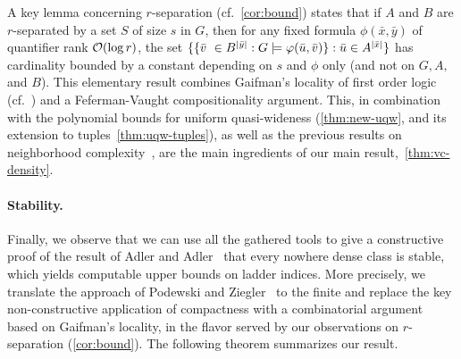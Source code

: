 A key lemma concerning $r$-separation (cf.~\cref{cor:bound}) states that if $A$
and $B$ are $r$-separated by a set $S$ of size $s$ in $G$,
then for any fixed formula $\phi(\bar x,\bar y)$
of quantifier rank $\mathcal{O}(\log r)$,
the set  $\{\{\bar{v}\ \in B^{|\bar y|} : G\models\varphi(\bar{u},\bar{v})\} : \bar{u}\in A^{|\bar x|}\}$ has cardinality bounded by a constant depending on $s$ and $\phi$ only (and not on $G,A,$ and $B$). 
This elementary result combines Gaifman's locality of first order logic (cf.~\cite{gaifman1982local}) and a Feferman-Vaught compositionality argument. This, in combination with the polynomial bounds 
for uniform quasi-wideness (\cref{thm:new-uqw}, and its extension to tuples~\cref{thm:uqw-tuples}), 
as well as the previous results on neighborhood complexity~\cite{drange2016kernelization,eickmeyer2016neighborhood}, are the main ingredients of our main result,~\cref{thm:vc-density}.






\paragraph{Stability.}
Finally, we observe that we can use all the gathered tools to give a constructive proof of the result of Adler and Adler~\cite{adler2014interpreting}
that every nowhere dense class is stable, which yields computable upper bounds on ladder indices.
More precisely, we translate the approach of Podewski and Ziegler~\cite{podewski1978stable} to the finite
and replace the key non-constructive application of compactness with a combinatorial argument based on Gaifman's locality,
in the flavor served by our observations on $r$-separation (\cref{cor:bound}).
The following theorem summarizes our result.

